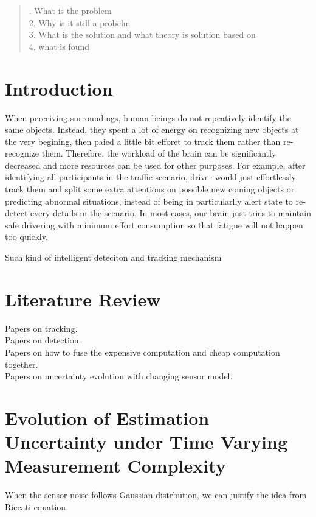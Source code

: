 \documentclass[12pt]{article}
\begin{document}
\maketitle

\begin{abstract}
. What is the problem\\
2. Why is it still a probelm\\
3. What is the solution and what theory is solution based on\\
4. what is found\\
\end{abstract}

\section{Introduction}\label{introduction}
\indent When perceiving surroundings, human beings do not repeatively identify the same objects. Instead, they spent a lot of energy on recognizing new objects at the very begining, then paied a little bit efforet to track them rather than re-recognize them. Therefore, the workload of the brain can be significantly decreased and more resources can be used for other purposes. For example, after identifying all participants in the traffic scenario, driver would just  effortlessly track them and split some extra attentions on possible new coming objects or predicting abnormal situations, instead of being in particularlly alert state to re-detect every details in the scenario. In most cases, our brain just tries to maintain safe drivering with minimum effort consumption so that fatigue will not happen too quickly.

Such kind of intelligent deteciton and tracking mechanism 

\section{Literature Review}\label{literature_review}
\noindent Papers on tracking.\\
Papers on detection.\\
Papers on how to fuse the expensive computation and cheap computation together.\\
Papers on uncertainty evolution with changing sensor model.

\section{Evolution of Estimation Uncertainty under Time Varying Measurement Complexity}\label{estmation_uncertainty}
When the sensor noise follows Gaussian distrbution, we can justify the idea from Riccati equation.
\end{document}
